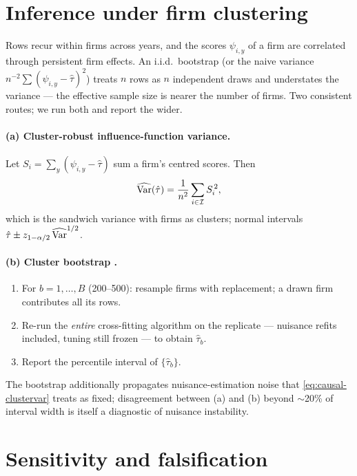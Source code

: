\section{Inference under firm clustering}\label{sec:causal-inference}

Rows recur within firms across years, and the scores $\psi_{i,y}$ of a firm are correlated
through persistent firm effects. An i.i.d.\ bootstrap (or the naive variance
$n^{-2}\sum(\psi_{i,y} - \hat\tau)^2$) treats $n$ rows as $n$ independent draws and understates
the variance --- the effective sample size is nearer the number of firms. Two consistent routes;
we run both and report the wider.

\paragraph{(a) Cluster-robust influence-function variance.} Let $S_i = \sum_{y} (\psi_{i,y} -
\hat\tau)$ sum a firm's centred scores. Then
\begin{equation}\label{eq:causal-clustervar}
\widehat{\operatorname{Var}}(\hat\tau) = \frac{1}{n^2} \sum_{i \in \mathcal{I}}
S_i^{\,2},
\end{equation}
which is the sandwich variance with firms as clusters; normal intervals $\hat\tau \pm
z_{1-\alpha/2}\,\widehat{\operatorname{Var}}^{1/2}$.

\paragraph{(b) Cluster bootstrap \citep{efron1994}.}
\begin{enumerate}
\item For $b = 1, \dots, B$ (200--500): resample firms with replacement; a drawn firm
contributes all its rows.
\item Re-run the \emph{entire} cross-fitting algorithm on the replicate --- nuisance refits
included, tuning still frozen --- to obtain $\hat\tau_b$.
\item Report the percentile interval of $\{\hat\tau_b\}$.
\end{enumerate}
The bootstrap additionally propagates nuisance-estimation noise that \cref{eq:causal-clustervar}
treats as fixed; disagreement between (a) and (b) beyond $\sim$20\% of interval width is itself
a diagnostic of nuisance instability.

\section{Sensitivity and falsification}\label{chca:sec:sens}

